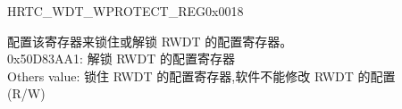 \begin{register}{H}{RTC\_WDT\_WPROTECT\_REG}{0x0018}\label{regdesc:RTCWDTWPROTECTREG}
%
\regnewline%
\begin{regdesc}\begin{reglist}
\label{fielddesc:RTCWDTWKEY}\item [RTC\_WDT\_WKEY] 配置该寄存器来锁住或解锁 RWDT 的配置寄存器。\\
0x50D83AA1: 解锁 RWDT 的配置寄存器 \\
Others value: 锁住 RWDT 的配置寄存器,软件不能修改 RWDT 的配置 \\
 (R/W)
\end{reglist}\end{regdesc}
\end{register}


